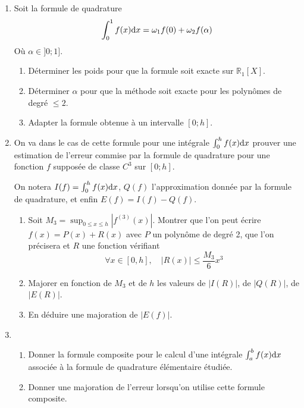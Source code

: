 \documentclass[a4paper]{article}
\def \de {{\rm d}}
\begin{document}
\section{}  \begin{enumerate}
\item Soit la formule de quadrature
\[\int_{0}^1f(x)\de x=\omega_1f(0)+\omega_2f(\alpha)\]
Où $\alpha \in ]0; 1]$.
\begin{enumerate}
\item Déterminer les poids pour que la formule soit exacte sur $\mathbb{R}_1[X]$.
\item Déterminer $\alpha$ pour que la méthode soit exacte pour les polynômes de degré $\leq 2$.
\item Adapter la formule obtenue à un intervalle $[0; h]$.
\end{enumerate}
\item  On va dans le cas de cette formule pour une intégrale $\int_{0}^hf(x)\de x$ prouver une estimation de l'erreur commise par la formule de quadrature pour une fonction $f$ supposée de classe $C^3$ sur $[0; h]$.

On notera $I(f) =\int_{0}^hf(x)\de x$, $Q(f)$ l'approximation donnée par la formule de quadrature, et enfin $E(f) = I(f) - Q(f)$.
\begin{enumerate}
\item  Soit $M_3 =\displaystyle \sup_{0\leq x\leq h}\left|f^{(3)}(x)\right|$.
Montrer que l'on peut écrire $f(x) = P(x) + R(x)$ avec $P$ un polynôme de degré 2,
que l'on précisera et $R$ une fonction vérifiant
\[\forall x\in [0,h],\quad |R(x)|\leq \frac{M_3}6x^3\]
\item  Majorer en fonction de $M_3$ et de $h$ les valeurs de $|I(R)|$, de $|Q(R)|$, de $|E(R)|$.
\item En déduire une majoration de $|E(f)|$.
\end{enumerate}

\item  \begin{enumerate}
\item   Donner la formule composite pour le calcul d'une intégrale $\int_{a}^bf(x)\de x$ associée à la formule de quadrature élémentaire étudiée.
\item  Donner une majoration de l'erreur lorsqu'on utilise cette formule composite.
\end{enumerate}
\end{enumerate}

\end{document}
